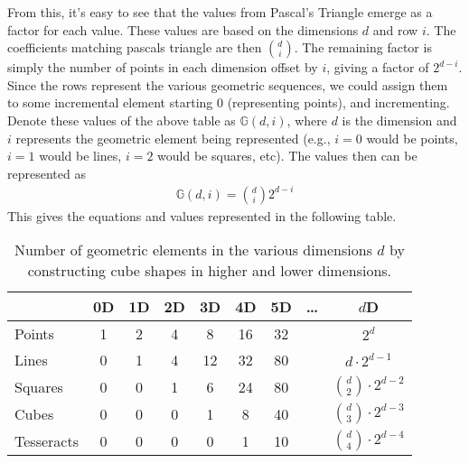 From this, it's easy to see that the values from Pascal's Triangle emerge as a factor for each value. These values are based on the dimensions $d$ and row $i$. The coefficients matching pascals triangle are then $\binom{d}{i}$. The remaining factor is simply the number of points in each dimension offset by $i$, giving a factor of $2^{d-i}$. Since the rows represent the various geometric sequences, we could assign them to some incremental element starting 0 (representing points), and incrementing. Denote these values of the above table as $\mathbb{G}(d,i)$, where $d$ is the dimension and $i$ represents the geometric element being represented (e.g., $i=0$ would be points, $i=1$ would be lines, $i=2$ would be squares, etc). The values then can be represented as
\begin{align}
	\mathbb{G}(d, i) = \binom{d}{i} 2^{d-i}
\end{align}
This gives the equations and values represented in the following table.
\begin{table}[htbp]
	\centering
	\begin{tabular}{lcccccccc}
		\toprule
		& 0D & 1D & 2D & 3D & 4D & 5D &\dots& \(d\)D \\
		\midrule
		Points     & 1  & 2  & 4  & 8  & 16 & 32 && \(2^d\) \\
		Lines      & 0  & 1  & 4  & 12 & 32 & 80 && \(d \cdot 2^{d-1}\) \\
		Squares    & 0  & 0  & 1  & 6  & 24 & 80 && \(\binom{d}{2} \cdot 2^{d-2}\) \\
		Cubes      & 0  & 0  & 0  & 1  & 8  & 40 && \(\binom{d}{3} \cdot 2^{d-3}\) \\
		Tesseracts & 0  & 0  & 0  & 0  & 1  & 10 && \(\binom{d}{4} \cdot 2^{d-4}\) \\
		\bottomrule
	\end{tabular}
	\caption{Number of geometric elements in the various dimensions $d$ by constructing cube shapes in higher and lower dimensions.}
	\label{tab:hypercube_elements}
\end{table}






















